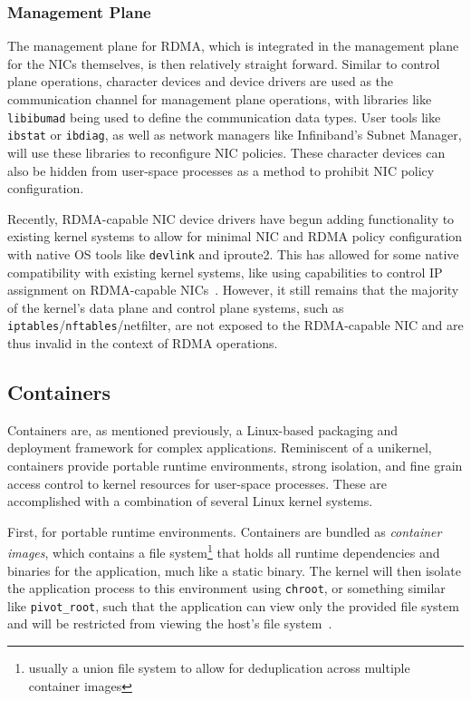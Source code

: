 \documentclass[12pt,titlepage]{article}
\begin{document}
\subsubsection{Management Plane}\label{subsubsec:Management Plane}
The management plane for RDMA, which is integrated in the management plane for the NICs themselves, is then relatively straight forward.
Similar to control plane operations, character devices and device drivers are used as the communication channel for management plane operations, with libraries like \texttt{libibumad} being used to define the communication data types.
User tools like \texttt{ibstat} or \texttt{ibdiag}, as well as network managers like Infiniband's Subnet Manager, will use these libraries to reconfigure NIC policies.
These character devices can also be hidden from user-space processes as a method to prohibit NIC policy configuration.

Recently, RDMA-capable NIC device drivers have begun adding functionality to existing kernel systems to allow for minimal NIC and RDMA policy configuration with native OS tools like \texttt{devlink} and iproute2.
This has allowed for some native compatibility with existing kernel systems, like using capabilities to control IP assignment on RDMA-capable NICs~\cite{mlnxofedmanual}.
However, it still remains that the majority of the kernel's data plane and control plane systems, such as \texttt{iptables}/\texttt{nftables}/netfilter, are not exposed to the RDMA-capable NIC and are thus invalid in the context of RDMA operations.

\subsection{Containers}\label{subsec:Containers}
Containers are, as mentioned previously, a Linux-based packaging and deployment framework for complex applications.
Reminiscent of a unikernel, containers provide portable runtime environments, strong isolation, and fine grain access control to kernel resources for user-space processes.
These are accomplished with a combination of several Linux kernel systems.

First, for portable runtime environments.
Containers are bundled as \textit{container images}, which contains a file system\footnote{usually a union file system to allow for deduplication across multiple container images} that holds all runtime dependencies and binaries for the application, much like a static binary.
The kernel will then isolate the application process to this environment using \texttt{chroot}, or something similar like \texttt{pivot\_root}, such that the application can view only the provided file system and will be restricted from viewing the host's file system~\cite{dockerunderthehood}.
\end{document}
